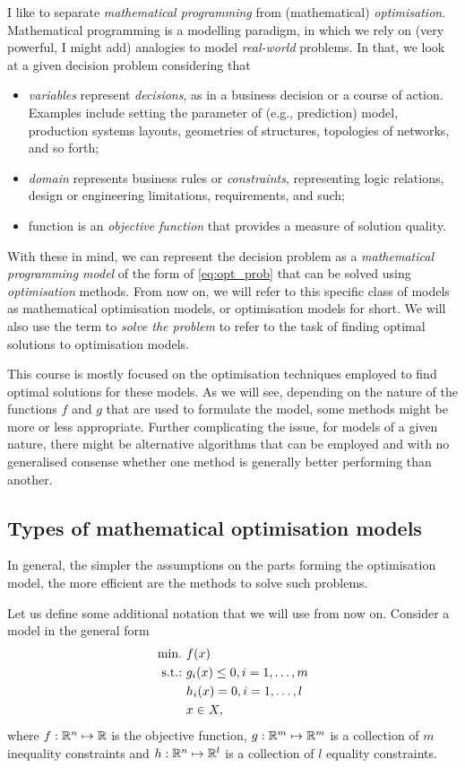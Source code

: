 I like to separate \emph{mathematical programming} from (mathematical) \emph{optimisation}. Mathematical programming is a modelling paradigm, in which we rely on (very powerful, I might add) analogies to model \emph{real-world} problems. In that, we look at a given decision problem considering that
%
\begin{itemize}
    \item \emph{variables} represent \emph{decisions}, as in a business decision or a course of action. Examples include setting the parameter of (e.g., prediction) model, production systems layouts, geometries of structures, topologies of networks, and so forth; 
    \item \emph{domain} represents business rules or \emph{constraints}, representing logic relations, design or engineering limitations, requirements, and such; 
    \item function is an \emph{objective function} that provides a measure of solution quality.  
\end{itemize}
%    
With these in mind, we can represent the decision problem as a \emph{mathematical programming model} of the form of \eqref{eq:opt_prob} that can be solved using \emph{optimisation} methods. From now on, we will refer to this specific class of models as mathematical optimisation models, or optimisation models for short. We will also use the term to \emph{solve the problem} to refer to the task of finding optimal solutions to optimisation models.

This course is mostly focused on the optimisation techniques employed to find optimal solutions for these models. As we will see, depending on the nature of the functions $f$ and $g$ that are used to formulate the model, some methods might be more or less appropriate. Further complicating the issue, for models of a given nature, there might be alternative algorithms that can be employed and with no generalised consense whether one method is generally better performing than another.

\subsection{Types of mathematical optimisation models}

In general, the simpler the assumptions on the parts forming the optimisation model, the more efficient are the methods to solve such problems. 

Let us define some additional notation that we will use from now on. Consider a model in the general form
%
\begin{align*}
	\mathop{\text{min.~}} & f(x) \\
	\mathop{\text{s.t.:~}}   & g_i(x) \leq 0, i = 1, \dots, m \\
	      & h_i(x) = 0, i = 1, \dots, l \\
	      & x \in X,  
\end{align*}
%
where $f: \mathbb{R}^n \mapsto \mathbb{R}$ is the objective function, $g:\mathbb{R}^m \mapsto \mathbb{R}^m$ is a collection of $m$ inequality constraints and $h: \mathbb{R}^n \mapsto \mathbb{R}^l$ is a collection of $l$ equality constraints.

